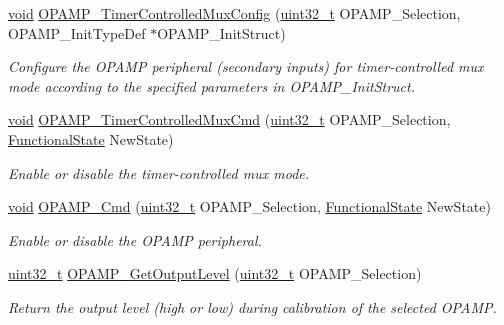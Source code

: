 \begin{DoxyCompactItemize}
\hyperlink{group___n_a_m_e_ga18028b8badbf1ea7e704ccac3c488e82}{void} \hyperlink{group___o_p_a_m_p___group1_gafb03a64bdcbc41ee0ca8d3b67f1059e7}{O\-P\-A\-M\-P\-\_\-\-Timer\-Controlled\-Mux\-Config} (\hyperlink{stdint_8h_a435d1572bf3f880d55459d9805097f62}{uint32\-\_\-t} O\-P\-A\-M\-P\-\_\-\-Selection, O\-P\-A\-M\-P\-\_\-\-Init\-Type\-Def $\ast$O\-P\-A\-M\-P\-\_\-\-Init\-Struct)
\begin{DoxyCompactList}\small\item\em Configure the O\-P\-A\-M\-P peripheral (secondary inputs) for timer-\/controlled mux mode according to the specified parameters in O\-P\-A\-M\-P\-\_\-\-Init\-Struct. \end{DoxyCompactList}\item 
\hyperlink{group___n_a_m_e_ga18028b8badbf1ea7e704ccac3c488e82}{void} \hyperlink{group___o_p_a_m_p___group1_ga0ec52a389f45403f60f71a32a3ad36f0}{O\-P\-A\-M\-P\-\_\-\-Timer\-Controlled\-Mux\-Cmd} (\hyperlink{stdint_8h_a435d1572bf3f880d55459d9805097f62}{uint32\-\_\-t} O\-P\-A\-M\-P\-\_\-\-Selection, \hyperlink{group___exported__types_gac9a7e9a35d2513ec15c3b537aaa4fba1}{Functional\-State} New\-State)
\begin{DoxyCompactList}\small\item\em Enable or disable the timer-\/controlled mux mode. \end{DoxyCompactList}\item 
\hyperlink{group___n_a_m_e_ga18028b8badbf1ea7e704ccac3c488e82}{void} \hyperlink{group___o_p_a_m_p___group1_gac5214b0a1166baf40cdc971e41c777da}{O\-P\-A\-M\-P\-\_\-\-Cmd} (\hyperlink{stdint_8h_a435d1572bf3f880d55459d9805097f62}{uint32\-\_\-t} O\-P\-A\-M\-P\-\_\-\-Selection, \hyperlink{group___exported__types_gac9a7e9a35d2513ec15c3b537aaa4fba1}{Functional\-State} New\-State)
\begin{DoxyCompactList}\small\item\em Enable or disable the O\-P\-A\-M\-P peripheral. \end{DoxyCompactList}\item 
\hyperlink{stdint_8h_a435d1572bf3f880d55459d9805097f62}{uint32\-\_\-t} \hyperlink{group___o_p_a_m_p___group1_ga4d3e1535b9bbe1f7540bf46401e92469}{O\-P\-A\-M\-P\-\_\-\-Get\-Output\-Level} (\hyperlink{stdint_8h_a435d1572bf3f880d55459d9805097f62}{uint32\-\_\-t} O\-P\-A\-M\-P\-\_\-\-Selection)
\begin{DoxyCompactList}\small\item\em Return the output level (high or low) during calibration of the selected O\-P\-A\-M\-P. \end{DoxyCompactList}\item 

\end{DoxyCompactItemize}
